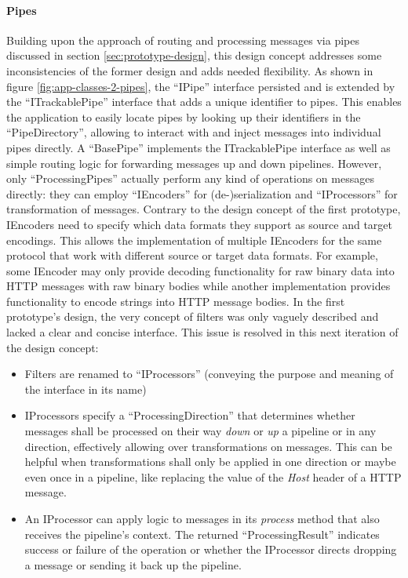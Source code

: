 \paragraph{Pipes} Building upon the approach of routing and processing messages via pipes discussed in section \ref{sec:prototype-design}, this design concept addresses some inconsistencies of the former design and adds needed flexibility. As shown in figure \ref{fig:app-classes-2-pipes}, the \enquote{IPipe} interface persisted and is extended by the \enquote{ITrackablePipe} interface that adds a unique identifier to pipes. This enables the application to easily locate pipes by looking up their identifiers in the \enquote{PipeDirectory}, allowing to interact with and inject messages into individual pipes directly. A \enquote{BasePipe} implements the ITrackablePipe interface as well as simple routing logic for forwarding messages up and down pipelines. However, only \enquote{ProcessingPipes} actually perform any kind of operations on messages directly: they can employ \enquote{IEncoders} for (de-)serialization and \enquote{IProcessors} for transformation of messages. Contrary to the design concept of the first prototype, IEncoders need to specify which data formats they support as source and target encodings. This allows the implementation of multiple IEncoders for the same protocol that work with different source or target data formats. For example, some IEncoder may only provide decoding functionality for raw binary data into \ac{HTTP} messages with raw binary bodies while another implementation provides functionality to encode strings into \ac{HTTP} message bodies. In the first prototype's design, the very concept of filters was only vaguely described and lacked a clear and concise interface. This issue is resolved in this next iteration of the design concept:
\begin{itemize}
    \item Filters are renamed to \enquote{IProcessors} (conveying the purpose and meaning of the interface in its name)
    \item IProcessors specify a \enquote{ProcessingDirection} that determines whether messages shall be processed on their way \emph{down} or \emph{up} a pipeline or in any direction, effectively allowing over transformations on messages. This can be helpful when transformations shall only be applied in one direction or maybe even once in a pipeline, like replacing the value of the \emph{Host} header of a \ac{HTTP} message.
    \item An IProcessor can apply logic to messages in its \emph{process} method that also receives the pipeline's context. The returned \enquote{ProcessingResult} indicates success or failure of the operation or whether the IProcessor directs dropping a message or sending it back up the pipeline.
\end{itemize}
